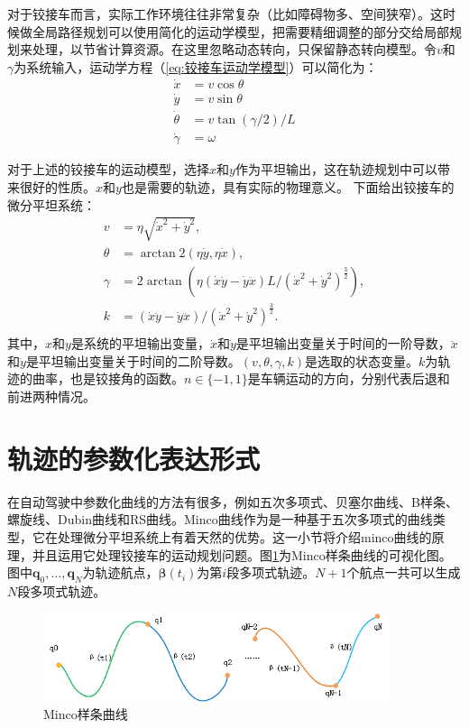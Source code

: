 \documentclass[master,academic]{ysuthesis} %
\begin{document}
		对于铰接车而言，实际工作环境往往非常复杂（比如障碍物多、空间狭窄）。这时候做全局路径规划可以使用简化的运动学模型，把需要精细调整的部分交给局部规划来处理，以节省计算资源。在这里忽略动态转向，只保留静态转向模型。令$v$和$\gamma$为系统输入，运动学方程（\ref{eq:铰接车运动学模型}）可以简化为：
		\begin{equation}
			\begin{aligned}
				\dot{x} &= v\cos\theta\\
				\dot{y} &= v\sin\theta\\
				\dot{\theta} &= v\tan( \gamma /2 ) /L\\
				\dot{\gamma} &= \omega
			\end{aligned}
		\end{equation} 

		对于上述的铰接车的运动模型，选择$x$和$y$作为平坦输出，这在轨迹规划中可以带来很好的性质。$x$和$y$也是需要的轨迹，具有实际的物理意义。
		下面给出铰接车的微分平坦系统：
		\begin{equation}
			\begin{aligned}
				v&=\eta \sqrt{\dot{x}^2+\dot{y}^2},\\
				\theta &=\arctan2( \eta \dot{y},\eta \dot{x} ) ,\\
				\gamma &=2\arctan( \eta ( \dot{x}\ddot{y}-\dot{y}\ddot{x} ) L/( \dot{x}^2+\dot{y}^2 ) ^{\frac{3}{2}} ) ,\\
				k&=( \dot{x}\ddot{y}-\dot{y}\ddot{x} ) /( \dot{x}^2+\dot{y}^2 ) ^{\frac{3}{2}}.\\
			\end{aligned}
		\end{equation}
	其中，$x$和$y$是系统的平坦输出变量，$\dot{x}$和$\dot{y}$是平坦输出变量关于时间的一阶导数，$\ddot{x}$和$\ddot{y}$是平坦输出变量关于时间的二阶导数。$(v,\theta,\gamma,k)$是选取的状态变量。$k$为轨迹的曲率，也是铰接角的函数。$n\in\{-1,1\}$是车辆运动的方向，分别代表后退和前进两种情况。

	\section{轨迹的参数化表达形式}
	在自动驾驶中参数化曲线的方法有很多，例如五次多项式、贝塞尔曲线、B样条、螺旋线、Dubin曲线和RS曲线。Minco曲线作为是一种基于五次多项式的曲线类型，它在处理微分平坦系统上有着天然的优势。这一小节将介绍minco曲线的原理，并且运用它处理铰接车的运动规划问题。图\ref{fig:minco}为Minco样条曲线的可视化图。图中$\bm{q}_{0},...,\bm{q}_{N}$为轨迹航点，$\bm{\beta}(t_i)$为第$i$段多项式轨迹。$N+1$个航点一共可以生成$N$段多项式轨迹。
	\begin{figure}[H]
		\centering
		\includegraphics[width=0.9\textwidth]{minco.png}
		\caption{Minco样条曲线}
		\label{fig:minco}
	\end{figure}
\end{document}
